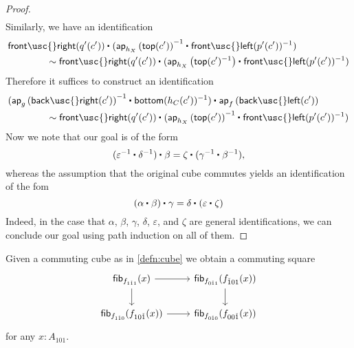 \begin{proof}
\begin{align*}
  \end{align*}
  Similarly, we have an identification
  \begin{align*}
    & \ct{\mathsf{front\usc{}right}(q'(c'))}{(\ct{\ap{h_X}{\mathsf{top}(c')}^{-1}}{\mathsf{front\usc{}left}(p'(c'))^{-1}})} \\
    & \qquad\qquad \htpy \ct{\mathsf{front\usc{}right}(q'(c'))}{(\ct{\ap{h_X}{\mathsf{top}(c')^{-1}}}{\mathsf{front\usc{}left}(p'(c'))^{-1}})}
  \end{align*}
  Therefore it suffices to construct an identification
  \begin{align*}
    & \ct{(\ct{\ap{g}{\mathsf{back\usc{}right}(c')}^{-1}}{\mathsf{bottom}(h_C(c'))^{-1}})}{\ap{f}{\mathsf{back\usc{}left}(c')}} \\
    & \qquad\qquad \htpy \ct{\mathsf{front\usc{}right}(q'(c'))}{(\ct{\ap{h_X}{\mathsf{top}(c')}^{-1}}{\mathsf{front\usc{}left}(p'(c'))^{-1}})}
  \end{align*}
  Now we note that our goal is of the form
  \begin{equation*}
    \ct{(\ct{\varepsilon^{-1}}{\delta^{-1}})}{\beta}=\ct{\zeta}{(\ct{\gamma^{-1}}{\beta^{-1}})}, %
  \end{equation*}
  whereas the assumption that the original cube commutes yields an identification of the fom
  \begin{equation*}
    \ct{(\ct{\alpha}{\beta})}{\gamma}=\ct{\delta}{(\ct{\varepsilon}{\zeta})}
  \end{equation*}
  Indeed, in the case that $\alpha$, $\beta$, $\gamma$, $\delta$, $\varepsilon$, and $\zeta$ are general identifications, we can conclude our goal using path induction on all of them.
\end{proof}

\begin{lem}
Given a commuting cube as in \cref{defn:cube} we obtain a commuting square
\begin{equation*}
\begin{tikzcd}
\fib{f_{1\check{1}1}}{x} \arrow[r] \arrow[d] & \fib{f_{0\check{1}1}}{f_{\check{1}01}(x)} \arrow[d] \\
\fib{f_{1\check{1}0}}{f_{10\check{1}}(x)} \arrow[r] & \fib{f_{0\check{1}0}}{f_{00\check{1}}(x)}
\end{tikzcd}
\end{equation*}
for any $x:A_{101}$. 
\end{lem}

